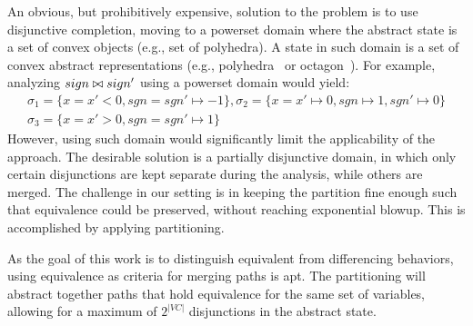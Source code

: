 An obvious, but prohibitively expensive, solution to the problem is to use disjunctive completion, moving to a powerset domain where the abstract state is a set of convex objects (e.g., set of polyhedra).
A state in such domain is a set of convex abstract representations (e.g., polyhedra~\cite{CousotHalbwachs78} or octagon~\cite{Mine2006}). For example, analyzing $sign \bowtie sign'$ using a powerset domain would yield:
{\footnotesize
\[
\begin{array}{c}
\sigma_1 = \{x = x' < 0, sgn = sgn' \mapsto -1\} ,
\sigma_2 = \{x = x' \mapsto 0, sgn \mapsto 1, sgn' \mapsto 0\}\\
\sigma_3 = \{x = x' > 0, sgn = sgn' \mapsto 1\}
\end{array}
\]
}
However, using such domain would significantly limit the applicability of the approach. The desirable solution is a partially disjunctive domain, in which only certain disjunctions are kept separate during the analysis, while others are merged. The challenge in our setting is in keeping the partition fine enough such that equivalence could be preserved, without reaching exponential blowup. This is accomplished by applying partitioning.

 As the goal of this work is to distinguish equivalent from differencing behaviors, using equivalence as criteria for merging paths is apt. The partitioning will abstract together paths that hold equivalence for the same set of variables, allowing for a maximum of $2^{|VC|}$ disjunctions in the abstract state.

